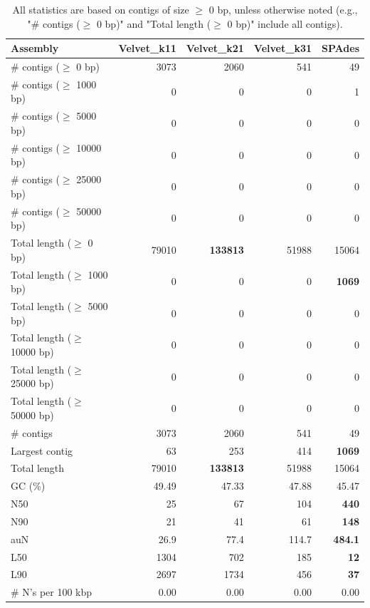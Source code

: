 \documentclass[12pt,a4paper]{article}
\begin{document}
\begin{table}[ht]
\begin{center}
\caption{All statistics are based on contigs of size $\geq$ 0 bp, unless otherwise noted (e.g., "\# contigs ($\geq$ 0 bp)" and "Total length ($\geq$ 0 bp)" include all contigs).}
\begin{tabular}{|l*{4}{|r}|}
\hline
Assembly & Velvet\_k11 & Velvet\_k21 & Velvet\_k31 & SPAdes \\ \hline
\# contigs ($\geq$ 0 bp) & 3073 & 2060 & 541 & 49 \\ \hline
\# contigs ($\geq$ 1000 bp) & 0 & 0 & 0 & 1 \\ \hline
\# contigs ($\geq$ 5000 bp) & 0 & 0 & 0 & 0 \\ \hline
\# contigs ($\geq$ 10000 bp) & 0 & 0 & 0 & 0 \\ \hline
\# contigs ($\geq$ 25000 bp) & 0 & 0 & 0 & 0 \\ \hline
\# contigs ($\geq$ 50000 bp) & 0 & 0 & 0 & 0 \\ \hline
Total length ($\geq$ 0 bp) & 79010 & {\bf 133813} & 51988 & 15064 \\ \hline
Total length ($\geq$ 1000 bp) & 0 & 0 & 0 & {\bf 1069} \\ \hline
Total length ($\geq$ 5000 bp) & 0 & 0 & 0 & 0 \\ \hline
Total length ($\geq$ 10000 bp) & 0 & 0 & 0 & 0 \\ \hline
Total length ($\geq$ 25000 bp) & 0 & 0 & 0 & 0 \\ \hline
Total length ($\geq$ 50000 bp) & 0 & 0 & 0 & 0 \\ \hline
\# contigs & 3073 & 2060 & 541 & 49 \\ \hline
Largest contig & 63 & 253 & 414 & {\bf 1069} \\ \hline
Total length & 79010 & {\bf 133813} & 51988 & 15064 \\ \hline
GC (\%) & 49.49 & 47.33 & 47.88 & 45.47 \\ \hline
N50 & 25 & 67 & 104 & {\bf 440} \\ \hline
N90 & 21 & 41 & 61 & {\bf 148} \\ \hline
auN & 26.9 & 77.4 & 114.7 & {\bf 484.1} \\ \hline
L50 & 1304 & 702 & 185 & {\bf 12} \\ \hline
L90 & 2697 & 1734 & 456 & {\bf 37} \\ \hline
\# N's per 100 kbp & 0.00 & 0.00 & 0.00 & 0.00 \\ \hline
\end{tabular}
\end{center}
\end{table}
\end{document}
